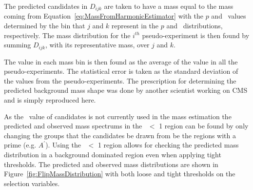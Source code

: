The predicted candidates in $D_{ijk}$ are taken to have a mass equal to the mass coming from Equation~\ref{eq:MassFromHarmonicEstimator} with the $p$ and \ih\ values
determined by the bin that $j$ and $k$ represent in the $p$ and \ih\ distributions, respectively. The mass distribution for the $i^{th}$ pseudo-experiment is then
found by summing $D_{ijk}$, with its representative mass, over $j$ and $k$.

The value in each mass bin is then found as the average of the value in all the pseudo-experiments. The statistical error is taken as the standard deviation of the values from
the pseudo-experiments. The prescription for determining the predicted background mass shape was done by another scientist working on CMS and is simply reproduced here.



As the \invbeta\ value of candidates is not currently used in the mass estimation the predicted and observed mass spectrums in the \invbeta\ $<$ 1 region can be
found by only changing the groups that the candidates be drawn from be the regions with a prime (e.g. $A^\prime$). Using the \invbeta\ $<$ 1 region allows for checking
the predicted mass distribution in a background dominated region even when applying tight thresholds. The predicted and observed mass distributions are shown in 
Figure~\ref{fig:FlipMassDistribution} with both loose and tight thresholds on the selection variables.

